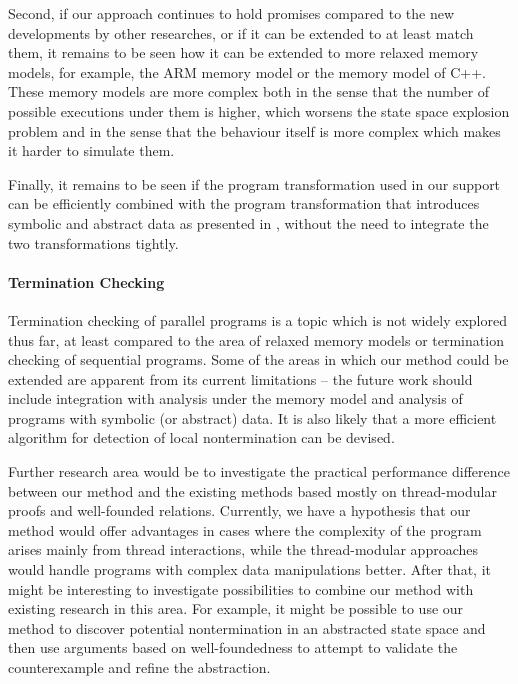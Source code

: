 Second, if our approach continues to hold promises compared to the new developments by other researches, or if it can be extended to at least match them, it remains to be seen how it can be extended to more relaxed memory models, for example, the ARM memory model or the memory model of C++.
These memory models are more complex both in the sense that the number of possible executions under them is higher, which worsens the state space explosion problem and in the sense that the behaviour itself is more complex which makes it harder to simulate them.

Finally, it remains to be seen if the program transformation used in our \xtso support can be efficiently combined with the program transformation that introduces symbolic and abstract data as presented in , without the need to integrate the two transformations tightly.

\paragraph{Termination Checking}

Termination checking of parallel programs is a topic which is not widely explored thus far, at least compared to the area of relaxed memory models or termination checking of sequential programs.
Some of the areas in which our method could be extended are apparent from its current limitations -- the future work should include integration with analysis under the \xtso memory model and analysis of programs with symbolic (or abstract) data.
It is also likely that a more efficient algorithm for detection of local nontermination can be devised.

Further research area would be to investigate the practical performance difference between our method and the existing methods based mostly on thread-modular proofs and well-founded relations.
Currently, we have a hypothesis that our method would offer advantages in cases where the complexity of the program arises mainly from thread interactions, while the thread-modular approaches would handle programs with complex data manipulations better.
After that, it might be interesting to investigate possibilities to combine our method with existing research in this area.
For example, it might be possible to use our method to discover potential nontermination in an abstracted state space and then use arguments based on well-foundedness to attempt to validate the counterexample and refine the abstraction.

